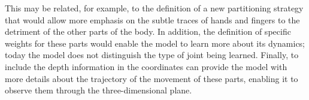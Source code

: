 This may be related, for example, to the definition of a new partitioning strategy that would allow more emphasis on the subtle traces of hands and fingers to the detriment of the other parts of the body. In addition, the definition of specific weights for these parts would enable the model to learn more about its dynamics; today the model does not distinguish the type of joint being learned. Finally, to include the depth information in the coordinates can provide the model with more details about the trajectory of the movement of these parts, enabling it to observe them through the three-dimensional plane.